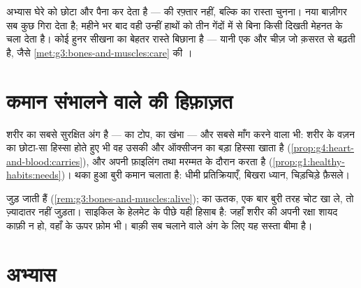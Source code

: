 \begin{remark}[घेरे को साधना]\label{rem:g5:brain-in-command:training}
अभ्यास घेरे को छोटा और पैना कर देता है ---  की रफ़्तार नहीं,
बल्कि  का रास्ता चुनना। नया बाज़ीगर सब कुछ गिरा देता है; महीने
भर बाद वही  उन्हीं हाथों को तीन गेंदों में से बिना किसी दिखती
मेहनत के चला देता है। कोई हुनर सीखना  का बेहतर रास्ते बिछाना है
--- यानी एक और चीज़ जो क़सरत से बढ़ती है, जैसे
\cref{met:g3:bones-and-muscles:care} की ।
\end{remark}

\section{कमान संभालने वाले की हिफ़ाज़त}

\begin{proposition}[नींद, भोजन, सुरक्षा]\label{prop:g5:brain-in-command:protect}
 शरीर का सबसे सुरक्षित अंग है ---  का टोप,  का खंभा
--- और सबसे माँग करने वाला भी: शरीर के वज़न का छोटा-सा हिस्सा होते हुए
भी वह उसकी  और ऑक्सीजन का बड़ा हिस्सा खाता है
(\cref{prop:g4:heart-and-blood:carries}), और अपनी फ़ाइलिंग तथा मरम्मत
\emph{} के दौरान करता है
(\cref{prop:g1:healthy-habits:needs})। थका हुआ  बुरी कमान
चलाता है: धीमी प्रतिक्रियाएँ, बिखरा ध्यान, चिड़चिड़े फ़ैसले।
\end{proposition}
\admitted

\begin{example}[हेलमेट घेरे के लिए हैं]\label{ex:g5:brain-in-command:helmet}
 जुड़ जाती हैं (\cref{rem:g3:bones-and-muscles:alive});
 का ऊतक, एक बार बुरी तरह चोट खा ले, तो ज़्यादातर नहीं जुड़ता।
साइकिल के हेलमेट के पीछे यही हिसाब है: जहाँ शरीर की अपनी रक्षा शायद
काफ़ी न हो, वहाँ  के ऊपर फ़ोम भी। बाक़ी सब चलाने वाले अंग के लिए
यह सस्ता बीमा है।
\end{example}

\section{अभ्यास}

